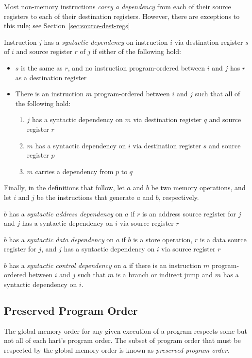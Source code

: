 Most non-memory instructions {\em carry a dependency} from each of their source registers to each of their destination registers.
However, there are exceptions to this rule; see Section~\ref{sec:source-dest-regs}

Instruction $j$ has a {\em syntactic dependency} on instruction $i$ via destination register $s$ of $i$ and source register $r$ of $j$ if either of the following hold:
\begin{itemize}
  \item $s$ is the same as $r$, and no instruction program-ordered between $i$ and $j$ has $r$ as a destination register
  \item There is an instruction $m$ program-ordered between $i$ and $j$ such that all of the following hold:
    \begin{enumerate}
      \item $j$ has a syntactic dependency on $m$ via destination register $q$ and source register $r$
      \item $m$ has a syntactic dependency on $i$ via destination register $s$ and source register $p$
      \item $m$ carries a dependency from $p$ to $q$
    \end{enumerate}
\end{itemize}

Finally, in the definitions that follow, let $a$ and $b$ be two memory operations, and let $i$ and $j$ be the instructions that generate $a$ and $b$, respectively.

$b$ has a {\em syntactic address dependency} on $a$ if $r$ is an address source register for $j$ and $j$ has a syntactic dependency on $i$ via source register $r$

$b$ has a {\em syntactic data dependency} on $a$ if $b$ is a store operation, $r$ is a data source register for $j$, and $j$ has a syntactic dependency on $i$ via source register $r$

$b$ has a {\em syntactic control dependency} on $a$ if there is an instruction $m$ program-ordered between $i$ and $j$ such that $m$ is a branch or indirect jump and $m$ has a syntactic dependency on $i$.

\subsection*{Preserved Program Order}
The global memory order for any given execution of a program respects some but not all of each hart's program order.
The subset of program order that must be respected by the global memory order is known as {\em preserved program order}.

